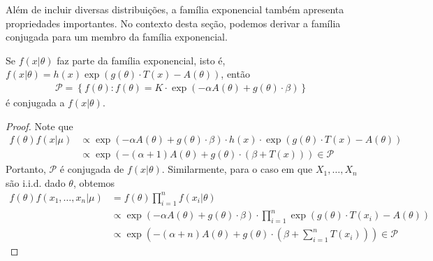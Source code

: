 Além de incluir diversas distribuições,
a família exponencial também apresenta
propriedades importantes. No contexto desta seção, 
podemos derivar a família conjugada para
um membro da família exponencial.

\begin{lemma}
 \label{lemma:exponential-family-conjugate}
 Se $f(x|\theta)$ faz parte da família exponencial,
 isto é, $f(x|\theta) = h(x) \exp\left(g(\theta) \cdot T(x) - A(\theta)\right)$, então
 \begin{align*}
  \mathcal{P} = \left\{f(\theta): f(\theta) 
  = K \cdot \exp\left(-\alpha A(\theta) + g(\theta) \cdot \beta\right) \right\}
 \end{align*}
 é conjugada a $f(x|\theta)$.
\end{lemma}

\begin{proof}
 Note que
 \begin{align*}
  f(\theta)f(x|\mu)
  &\propto \exp\left(-\alpha A(\theta)
  +g(\theta) \cdot \beta\right) \cdot h(x)
  \cdot \exp\left(g(\theta) \cdot T(x)
  -A(\theta)\right) \\
  &\propto \exp\left(-(\alpha+1)A(\theta)
  +g(\theta) \cdot (\beta+T(x))\right) \in \mathcal{P}
 \end{align*}
 Portanto, $\mathcal{P}$ é conjugada de $f(x|\theta)$.
 Similarmente, para o caso em que
 $X_{1},\ldots,X_{n}$ são i.i.d. dado $\theta$,
 obtemos
 \begin{align*}
  f(\theta)f(x_{1},\ldots,x_{n}|\mu)
  &=f(\theta)\prod_{i=1}^{n}{f(x_{i}|\theta)} \\
  &\propto \exp\left(-\alpha A(\theta)
  +g(\theta) \cdot \beta\right) \cdot \prod_{i=1}^{n}
  {\exp\left(g(\theta) \cdot T(x_{i})
  -A(\theta)\right)} \\
  &\propto \exp\left(-(\alpha+n)A(\theta)
  +g(\theta) \cdot \left(\beta+\sum_{i=1}^{n}
  {T(x_{i})}\right)\right) \in \mathcal{P}
 \end{align*}
\end{proof}

